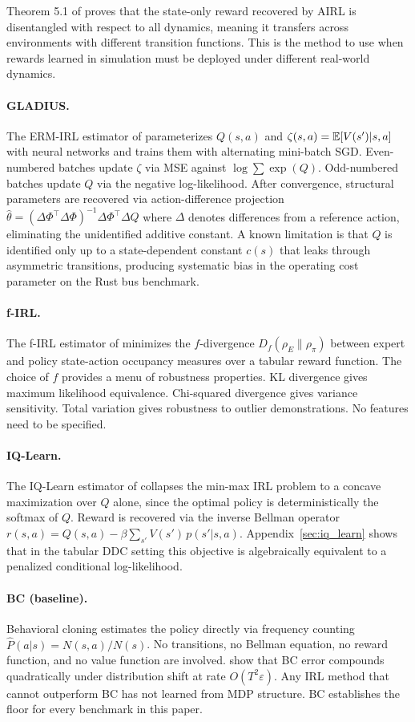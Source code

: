 Theorem 5.1 of \citet{fu2018} proves that the state-only reward recovered by AIRL is disentangled with respect to all dynamics, meaning it transfers across environments with different transition functions.
This is the method to use when rewards learned in simulation must be deployed under different real-world dynamics.

\paragraph{GLADIUS.}
The ERM-IRL estimator of \citet{kang2025} parameterizes $Q(s,a)$ and $\zeta(s,a) = \mathbb{E}[V(s')|s,a]$ with neural networks and trains them with alternating mini-batch SGD.
Even-numbered batches update $\zeta$ via MSE against $\log\sum\exp(Q)$.
Odd-numbered batches update $Q$ via the negative log-likelihood.
After convergence, structural parameters are recovered via action-difference projection $\hat\theta = (\Delta\Phi^\top\Delta\Phi)^{-1}\Delta\Phi^\top\Delta Q$ where $\Delta$ denotes differences from a reference action, eliminating the unidentified additive constant.
A known limitation is that $Q$ is identified only up to a state-dependent constant $c(s)$ that leaks through asymmetric transitions, producing systematic bias in the operating cost parameter on the Rust bus benchmark.

\paragraph{f-IRL.}
The f-IRL estimator of \citet{ni2022} minimizes the $f$-divergence $D_f(\rho_E \| \rho_\pi)$ between expert and policy state-action occupancy measures over a tabular reward function.
The choice of $f$ provides a menu of robustness properties.
KL divergence gives maximum likelihood equivalence.
Chi-squared divergence gives variance sensitivity.
Total variation gives robustness to outlier demonstrations.
No features need to be specified.

\paragraph{IQ-Learn.}
The IQ-Learn estimator of \citet{garg2021} collapses the min-max IRL problem to a concave maximization over $Q$ alone, since the optimal policy is deterministically the softmax of $Q$.
Reward is recovered via the inverse Bellman operator $r(s,a) = Q(s,a) - \beta\sum_{s'} V(s')\,p(s'|s,a)$.
Appendix~\ref{sec:iq_learn} shows that in the tabular DDC setting this objective is algebraically equivalent to a penalized conditional log-likelihood.

\paragraph{BC (baseline).}
Behavioral cloning \citep{pomerleau1991} estimates the policy directly via frequency counting $\hat P(a|s) = N(s,a)/N(s)$.
No transitions, no Bellman equation, no reward function, and no value function are involved.
\citet{ross2011} show that BC error compounds quadratically under distribution shift at rate $O(T^2\varepsilon)$.
Any IRL method that cannot outperform BC has not learned from MDP structure.
BC establishes the floor for every benchmark in this paper.
